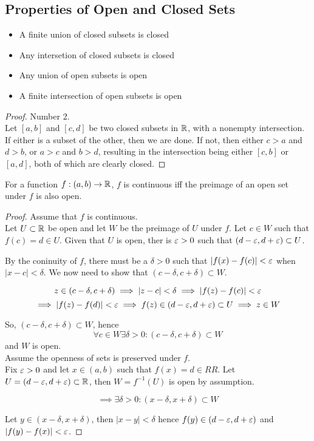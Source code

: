 \documentclass[a4paper,10pt]{article}
\begin{document}
\subsection{Properties of Open and Closed Sets}

\begin{itemize}
	\item A finite union of closed subsets is closed
	\item Any intersetion of closed subsets is closed
	\item Any union of open subsets is open
	\item A finite intersection of open subsets is open
\end{itemize}

\begin{proof}
	Number 2. \\

	Let $[a,b]$ and $[c,d]$ be two closed subsets in $\mathbb{R}$, with a
	nonempty intersection.  If either is a subset of the other, then
	we are done.  If not, then either $c>a$ and $d>b$, or $a>c$ and
	$b>d$, resulting in the intersection being either $[c,b]$ or
	$[a,d]$, both of which are clearly closed.
\end{proof}

\begin{thm}
	For a function $f:(a,b) \to \mathbb{R}$, $f$ is continuous iff the
	preimage of an open set under $f$ is also open.
\end{thm}

\begin{proof}
	Assume that $f$ is continuous. \\

	Let $U \subset \mathbb{R}$ be open and let $W$ be the preimage of $U$
	under $f$.  Let $c \in W$ such that $f(c) = d \in U$. Given that
	$U$ is open, ther is $\varepsilon > 0$ such that $(d-\varepsilon, d+\varepsilon)
	\subset U$.

	By the coninuity of $f$, there must be a $\delta > 0$ such that
	$|f(x) - f(c)| < \varepsilon$ when $|x-c| < \delta$. We now need to
	show that $(c-\delta, c+\delta) \subset W$.

	\[
		z \in (c-\delta, c+\delta) \implies |z-c| < \delta
		\implies |f(z)-f(c)| < \varepsilon
	\]
	\[
		\implies |f(z) - f(d)| < \varepsilon
		\implies f(z) \in (d-\varepsilon, d+\varepsilon) \subset U
		\implies z \in W
	\]

	So, $(c-\delta, c+\delta) \subset W$, hence
	\[
		\forall c \in W \exists \delta > 0 :
		(c-\delta, c+\delta) \subset W
	\]
	and $W$ is open. \\

	Assume the openness of sets is preserved under $f$. \\

	Fix $\varepsilon > 0$ and let $x \in (a,b)$ such that $f(x) = d \in
	RR$.  Let $U = (d-\varepsilon, d+\varepsilon) \subset \mathbb{R}$, then $W =
	f^{-1}(U)$ is open by assumption.

	\[
		\implies \exists \delta > 0 :
		(x-\delta, x+\delta) \subset W
	\]

	Let $y \in (x-\delta, x+\delta)$, then $|x-y| < \delta$ hence
	$f(y) \in (d-\varepsilon, d+\varepsilon)$ and $|f(y) - f(x)| < \varepsilon$.

\end{proof}
\end{document}
